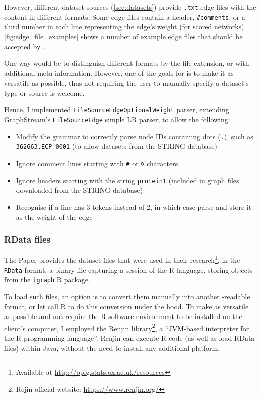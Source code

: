 However, different dataset sources (\autoref{sec:datasets}) provide \texttt{.txt} edge files with the content in different formats.
Some edge files contain a header, \texttt{\#comments}, or a third number in each line representing the edge's weight (for \hyperref[sec:scored_networks]{scored networks}).
\autoref{fig:edge_file_examples} shows a number of example edge files that should be accepted by \graffs.



One way would be to distinguish different formats by the file extension, or with additional meta information.
However, one of the goals for \graffs is to make it as versatile as possible, thus not requiring the user to manually specify a dataset's type or source is welcome.

Hence, I implemented \texttt{FileSourceEdgeOptionalWeight} parser, extending GraphStream's \texttt{FileSourceEdge} simple LR parser, to allow the following:
\begin{itemize}[topsep=5pt]
    \item Modify the grammar to correctly parse node IDs containing dots (\texttt{.}), such as \texttt{362663.ECP\_0001} (to allow datasets from the STRING database)
    \item Ignore comment lines starting with \texttt{\#} or \texttt{\%} characters
    \item Ignore headers starting with the string \texttt{protein1} (included in graph files downloaded from the STRING database)
    \item Recognise if a line has 3 tokens instead of 2, in which case parse and store it as the weight of the edge
\end{itemize}

\subsubsection{RData files}\label{sec:rdata_files}

The Paper\cite{Bozhilova2019} provides the dataset files that were used in their research\footnote{Available at \url{http://opig.stats.ox.ac.uk/resources}}, in the \texttt{RData} format, a binary file capturing a session of the R language, storing objects from the \texttt{igraph} R package.

To load such files, an option is to convert them manually into another \graffs-readable format, or let \graffs call R to do this conversion under the hood.
To make \graffs as versatile as possible and not require the R software environment to be installed on the client's computer, I employed the Renjin library\footnote{Rejin official website: \url{https://www.renjin.org/}}, a \enquote{JVM-based interpreter for the R programming language}.
Renjin can execute R code (as well as load RData files) within Java, without the need to install any additional platform.

